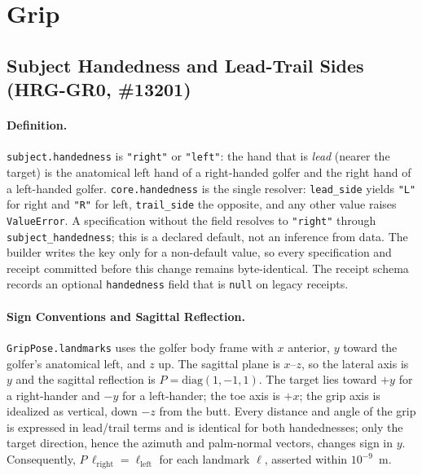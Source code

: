 \documentclass[11pt,a4paper]{article}
\begin{document}
\section{Grip}

\subsection{Subject Handedness and Lead-Trail Sides (HRG-GR0, \#13201)}

\paragraph{Definition.}
\texttt{subject.handedness} is \texttt{"right"} or \texttt{"left"}: the hand that
is \emph{lead} (nearer the target) is the anatomical left hand of a right-handed
golfer and the right hand of a left-handed golfer. \texttt{core.handedness} is the
single resolver: \texttt{lead\_side} yields \texttt{"L"} for right and \texttt{"R"}
for left, \texttt{trail\_side} the opposite, and any other value raises \texttt{ValueError}.
A specification without the field resolves to \texttt{"right"} through
\texttt{subject\_handedness}; this is a declared default, not an inference from data.
The builder writes the key only for a non-default value, so every specification and
receipt committed before this change remains byte-identical. The receipt schema records
an optional \texttt{handedness} field that is \texttt{null} on legacy receipts.

\paragraph{Sign Conventions and Sagittal Reflection.}
\texttt{GripPose.landmarks} uses the golfer body frame with $x$ anterior, $y$ toward
the golfer's anatomical left, and $z$ up. The sagittal plane is $x$--$z$, so the lateral
axis is $y$ and the sagittal reflection is $P = \mathrm{diag}(1, -1, 1)$. The target
lies toward $+y$ for a right-hander and $-y$ for a left-hander; the toe axis is $+x$;
the grip axis is idealized as vertical, down $-z$ from the butt. Every distance and
angle of the grip is expressed in lead/trail terms and is identical for both handednesses;
only the target direction, hence the azimuth and palm-normal vectors, changes sign in $y$.
Consequently, $P\,\ell_{\mathrm{right}} = \ell_{\mathrm{left}}$ for each landmark $\ell$,
asserted within $10^{-9}$~m.
\end{document}
